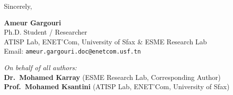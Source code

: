 \documentclass[11pt,a4paper]{article}
\begin{document}
\vspace{2em}

Sincerely,

\vspace{1.5em}
\textbf{Ameur Gargouri} \\
Ph.D. Student / Researcher \\
ATISP Lab, ENET'Com, University of Sfax \& ESME Research Lab \\
Email: \texttt{ameur.gargouri.doc@enetcom.usf.tn}

\vspace{1.2em}
\textit{On behalf of all authors:} \\
\textbf{Dr.\ Mohamed Karray} (ESME Research Lab, Corresponding Author) \\
\textbf{Prof.\ Mohamed Ksantini} (ATISP Lab, ENET'Com, University of Sfax)
\end{document}
